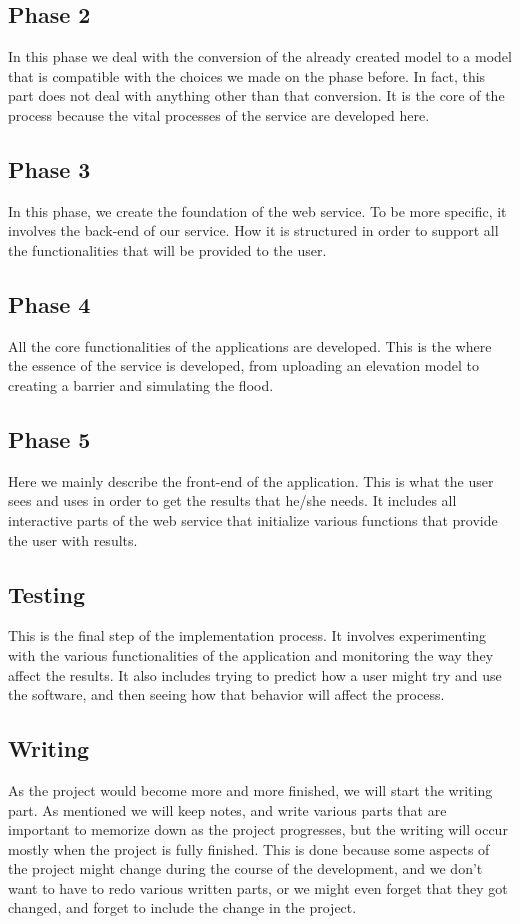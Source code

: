 \subsection{Phase 2}
In this phase we deal with the conversion of the already created model to a model that is compatible with the choices we made on the phase before. In fact, this part does not deal with anything other than that conversion. It is the core of the process because the vital processes of the service are developed here.

\subsection{Phase 3}
In this phase, we create the foundation of the web service. To be more specific, it involves the back-end of our service. How it is structured in order to support all the functionalities that will be provided to the user. 

\subsection{Phase 4}
All the core functionalities of the applications are developed. This is the where the essence of the service is developed, from uploading an elevation model to creating a barrier and simulating the flood. 

\subsection{Phase 5}
Here we mainly describe the front-end of the application. This is what the user sees and uses in order to get the results that he/she needs. It includes all interactive parts of the web service that initialize various functions  that provide the user with results.

\subsection{Testing}
This is the final step of the implementation process. It involves experimenting with the various functionalities of the application and monitoring the way they affect the results. It also includes trying to predict how a user might try and use the software, and then seeing how that behavior will affect the process.

\subsection{Writing}
As the project would become more and more finished, we will start the writing part. As mentioned we will keep notes, and write various parts that are important to memorize down as the project progresses, but the writing will occur mostly when the project is fully finished. This is done because some aspects of the project might change during the course of the development, and we don't want to have to redo various written parts, or we might even forget that they got changed, and forget to include the change in the project. 

